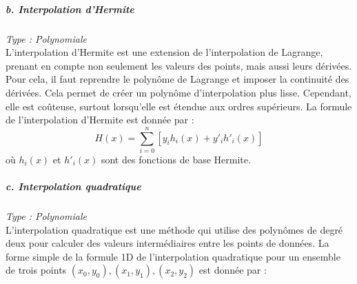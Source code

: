 

\subparagraph{b. Interpolation d'Hermite \cite{bajaj}}
\textit{Type : Polynomiale} \\
\phantom{----}L'interpolation d'Hermite est une extension de l'interpolation de Lagrange, prenant en compte non seulement les valeurs des points, mais aussi leurs dérivées. Pour cela, il faut reprendre le polynôme de Lagrange et imposer la continuité des dérivées. Cela permet de créer un polynôme d'interpolation plus lisse. Cependant, elle est coûteuse, surtout lorsqu'elle est étendue aux ordres supérieurs. La formule de l'interpolation d'Hermite est donnée par :
\begin{equation}
    H(x) = \sum_{i=0}^{n} \left[ y_i h_i(x) + y'_i h'_i(x) \right]
\end{equation}
où \( h_i(x) \) et \( h'_i(x) \) sont des fonctions de base Hermite.


\subparagraph{c. Interpolation quadratique \cite{alexis}}
\textit{Type : Polynomiale} \\
\phantom{----}L'interpolation quadratique est une méthode qui utilise des polynômes de degré deux pour calculer des valeurs intermédiaires entre les points de données.
La forme simple de la formule 1D de l'interpolation quadratique pour un ensemble de trois points \( (x_0, y_0), (x_1, y_1), (x_2, y_2) \) est donnée par :

\vspace{-0,3 cm}


